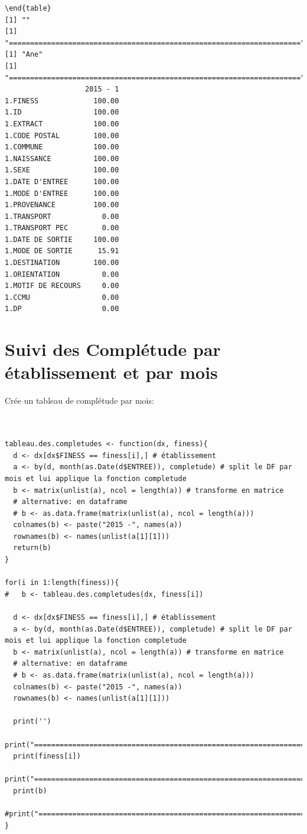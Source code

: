 \documentclass[]{article}
\begin{document}
\begin{verbatim}
\end{table} 
[1] ""
[1] "====================================================================="
[1] "Ane"
[1] "====================================================================="
                   2015 - 1
1.FINESS             100.00
1.ID                 100.00
1.EXTRACT            100.00
1.CODE POSTAL        100.00
1.COMMUNE            100.00
1.NAISSANCE          100.00
1.SEXE               100.00
1.DATE D'ENTREE      100.00
1.MODE D'ENTREE      100.00
1.PROVENANCE         100.00
1.TRANSPORT            0.00
1.TRANSPORT PEC        0.00
1.DATE DE SORTIE     100.00
1.MODE DE SORTIE      15.91
1.DESTINATION        100.00
1.ORIENTATION          0.00
1.MOTIF DE RECOURS     0.00
1.CCMU                 0.00
1.DP                   0.00
\end{verbatim}

\section{Suivi des Complétude par établissement et par
mois}\label{suivi-des-completude-par-etablissement-et-par-mois}

Crée un tableau de complétude par mois:

\begin{verbatim}


tableau.des.completudes <- function(dx, finess){
  d <- dx[dx$FINESS == finess[i],] # établissement
  a <- by(d, month(as.Date(d$ENTREE)), completude) # split le DF par mois et lui applique la fonction completude
  b <- matrix(unlist(a), ncol = length(a)) # transforme en matrice
  # alternative: en dataframe
  # b <- as.data.frame(matrix(unlist(a), ncol = length(a)))
  colnames(b) <- paste("2015 -", names(a))
  rownames(b) <- names(unlist(a[1][1]))
  return(b)
}

for(i in 1:length(finess)){
#   b <- tableau.des.completudes(dx, finess[i])
  
  d <- dx[dx$FINESS == finess[i],] # établissement
  a <- by(d, month(as.Date(d$ENTREE)), completude) # split le DF par mois et lui applique la fonction completude
  b <- matrix(unlist(a), ncol = length(a)) # transforme en matrice
  # alternative: en dataframe
  # b <- as.data.frame(matrix(unlist(a), ncol = length(a)))
  colnames(b) <- paste("2015 -", names(a))
  rownames(b) <- names(unlist(a[1][1]))
  
  print('')
  print("=====================================================================")
  print(finess[i])
  print("=====================================================================")
  print(b)
  #print("=====================================================================")
}
\end{verbatim}
\end{document}
